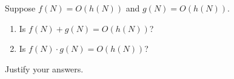Suppose $f(N) = O(h(N))$ and $g(N) = O(h(N))$.

\begin{enumerate}

\item  Is $f(N) + g(N) = O(h(N))$?

\item  Is $f(N)\cdot  g(N) = O(h(N))$?

\end{enumerate}

Justify your answers.
